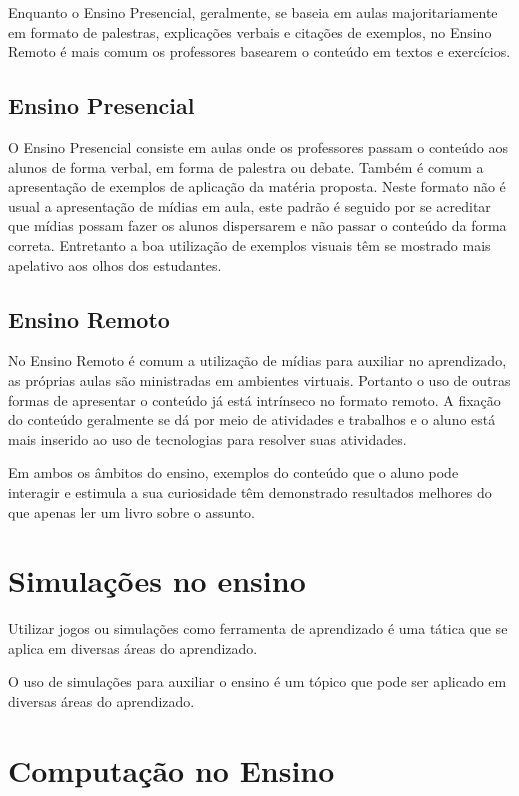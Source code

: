 \documentclass[tcc,capa]{texufpel}
\begin{document}
Enquanto o Ensino Presencial, geralmente, se baseia em aulas majoritariamente em formato de palestras, explicações verbais e citações de exemplos, no Ensino Remoto é mais comum os professores basearem o conteúdo em textos e exercícios.

\subsection{Ensino Presencial}

O Ensino Presencial consiste em aulas onde os professores passam o conteúdo aos alunos de forma verbal, em forma de palestra ou debate. Também é comum a apresentação de exemplos de aplicação da matéria proposta. Neste formato não é usual a apresentação de mídias em aula, este padrão é seguido por se acreditar que mídias possam fazer os alunos dispersarem e não passar o conteúdo da forma correta. Entretanto a boa utilização de exemplos visuais têm se mostrado mais apelativo aos olhos dos estudantes.

\subsection{Ensino Remoto}

No Ensino Remoto é comum a utilização de mídias para auxiliar no aprendizado, as próprias aulas são ministradas em ambientes virtuais. Portanto o uso de outras formas de apresentar o conteúdo já está intrínseco no formato remoto. A fixação do conteúdo geralmente se dá por meio de atividades e trabalhos e o aluno está mais inserido ao uso de tecnologias para resolver suas atividades.

Em ambos os âmbitos do ensino, exemplos do conteúdo que o aluno pode interagir e estimula a sua curiosidade têm demonstrado resultados melhores do que apenas ler um livro sobre o assunto.

\section{Simulações no ensino}%

Utilizar jogos ou simulações como ferramenta de aprendizado é uma tática que se aplica em diversas áreas do aprendizado. 

O uso de simulações para auxiliar o ensino é um tópico que pode ser aplicado em diversas áreas do aprendizado. 

\section{Computação no Ensino}
\end{document}
